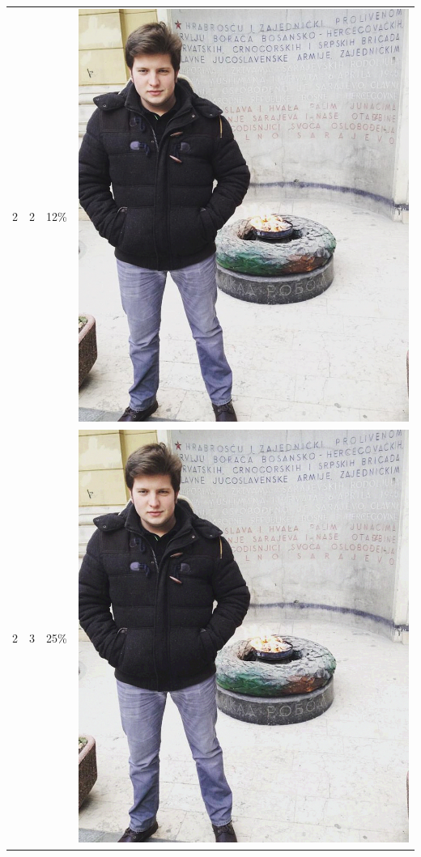 \documentclass[times, utf8, seminar]{fer}
\begin{document}
\begin{center}
\begin{longtable}{|c|c|c|c|}
2 & 2 &12\% & \includegraphics[scale=0.3]{../benchmark_results/pattern/2_components-2_bits.png} \\
2 & 3 &25\% & \includegraphics[scale=0.3]{../benchmark_results/pattern/2_components-3_bits.png} \\

\end{longtable}
\end{center}
\end{document}
